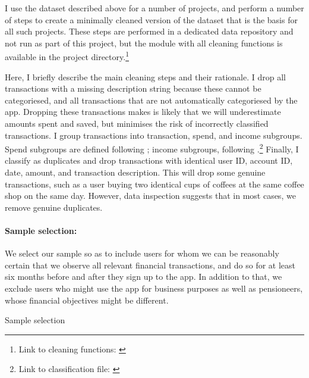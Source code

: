 I use the dataset described above for a number of projects, and perform a
number of steps to create a minimally cleaned version of the dataset that is
the basis for all such projects. These steps are performed in a dedicated
data repository and not run as part of this project, but the module with
all cleaning functions is available in the project directory.\footnote{Link to
    cleaning functions:
\href{https:/egithub.com/fabiangunzinger/mdb_eval/blob/f51e49c95c5884d2dc417be23921a8acd85aec9d/src/data/clean.py}{\faGithub}}

Here, I briefly describe the main cleaning steps and their rationale. I drop
all transactions with a missing description string because these cannot be
categoriesed, and all transactions that are not automatically categoriesed by
the app. Dropping these transactions makes is likely that we will underestimate
amounts spent and saved, but minimises the risk of incorrectly classified
transactions. I group transactions into transaction, spend, and income
subgroups. Spend subgroups are defined following \citet{muggleton2020evidence};
income subgroups, following \citet{hacioglu2020distributional}.\footnote{Link
to classification file:
\href{https://github.com/fabiangunzinger/mdb_eval/blob/92af366d4c4052cc7a7f78a6178086de8ecdfb75/src/data/txn_classifications.py}{\faGithub}}
Finally, I classify as duplicates and drop transactions with identical user ID,
account ID, date, amount, and transaction description. This will drop some
genuine transactions, such as a user buying two identical cups of coffees at
the same coffee shop on the same day. However, data inspection suggests that in
most cases, we remove genuine duplicates.


\paragraph{Sample selection:}%
\label{par:sample_selection}

We select our sample so as to include users for whom we can be reasonably
certain that we observe all relevant financial transactions, and do so for at
least six months before and after they sign up to the app. In addition to that,
we exclude users who might use the app for business purposes as well as
pensioneers, whose financial objectives might be different.

\begin{table}
\centering
\caption{Sample selection}\label{tab:selection}

\end{table}


